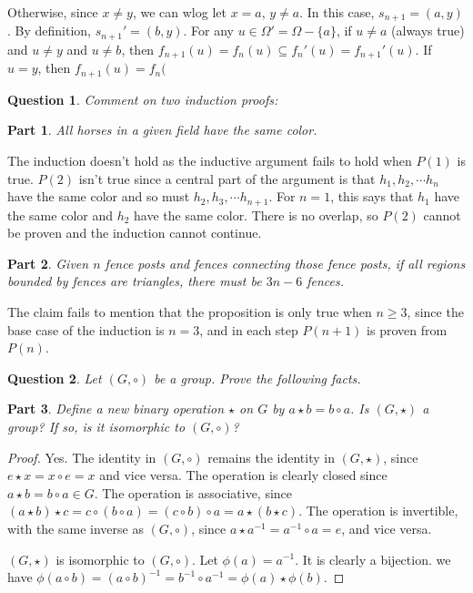 \documentclass[12pt]{article}
\theoremstyle{customstyle}
\newtheorem{question}{Question}
\newtheorem{subquestion}{Part}[question]
\begin{document}
Otherwise, since $x \ne y$, we can wlog let $x = a$, $y \ne a$.
In this case, $s_{n+1} = (a,y)$.
By definition, $s _{n+1}' = (b,y)$.
For any $u \in \Omega' = \Omega - \{a\}$, if $u \ne a$ (always true) and $u \ne y$ and $u \ne b$,
then $f_{n+1}(u) = f_n(u) \subseteq f_n'(u) = f_{n+1}'(u)$.
If $u = y$, then
$f_{n+1}(u) = f_n($

\begin{question}
    Comment on two induction proofs:
\end{question}

\begin{subquestion}
    All horses in a given field have the same color.
\end{subquestion}

The induction doesn't hold as the inductive argument fails to hold
when $P(1)$ is true. $P(2)$ isn't true since a central part of the
argument is that $h_{1},h_{2},\cdots h_n$ have the same color
and so must $h_{2},h_{3},\cdots h_{n+1}$. For $n=1$, this says
that $h_{1}$ have the same color and $h_{2}$ have the same color.
There is no overlap, so $P(2)$ cannot be proven and
the induction cannot continue.

\begin{subquestion}
    Given $n$ fence posts and fences connecting those fence posts,
    if all regions bounded by fences are triangles, there must be $3n-6$ fences.
\end{subquestion}

The claim fails to mention that the proposition is
only true when $n \ge 3$, since the base case of the
induction is $n = 3$, and in each step $P(n+1)$ is proven from $P(n)$.

\begin{question}
    Let $(G,\circ)$ be a group. Prove the following facts.
\end{question}
\begin{subquestion}
    Define a new binary operation $\star$ on $G$ by $a \star b = b \circ a$.
    Is $(G,\star)$ a group? If so, is it isomorphic to $(G,\circ)$?
\end{subquestion}

\begin{proof}
    Yes. The identity in $(G,\circ)$ remains the identity in $(G,\star)$,
    since $e \star x = x \circ e = x$ and vice versa.
    The operation is clearly closed since $a \star b = b \circ a \in G$.
    The operation is associative, since
    $(a \star b) \star c = c \circ (b \circ a) = (c \circ b) \circ a = a \star (b \star c)$.
    The operation is invertible, with the same inverse as $(G,\circ)$,
    since $a \star a^{-1} = a^{-1} \circ a = e$, and vice versa.

    $(G,\star)$ is isomorphic to $(G,\circ)$. Let $\phi(a) = a^{-1}$. 
    It is clearly a bijection. we have
    $\phi(a \circ b) = (a \circ b)^{-1} = b^{-1} \circ a^{-1} = \phi(a) \star \phi(b)$.
\end{proof}
\end{document}
